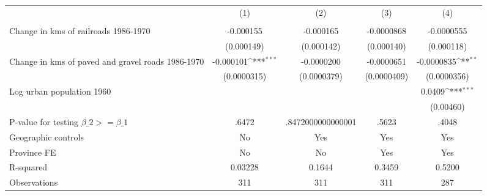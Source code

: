 {
\def\sym#1{\ifmmode^{#1}\else\(^{#1}\)\fi}
\begin{tabular}{l*{4}{c}}
\hline\hline
                &\multicolumn{1}{c}{(1)}&\multicolumn{1}{c}{(2)}&\multicolumn{1}{c}{(3)}&\multicolumn{1}{c}{(4)}\\
                &\multicolumn{1}{c}{}&\multicolumn{1}{c}{}&\multicolumn{1}{c}{}&\multicolumn{1}{c}{}\\
\hline
Change in kms of railroads 1986-1970&-0.000155         &-0.000165         &-0.0000868         &-0.0000555         \\
                &(0.000149)         &(0.000142)         &(0.000140)         &(0.000118)         \\
[1em]
Change in kms of paved and gravel roads 1986-1970&-0.000101\sym{***}&-0.0000200         &-0.0000651         &-0.0000835\sym{**} \\
                &(0.0000315)         &(0.0000379)         &(0.0000409)         &(0.0000356)         \\
[1em]
Log urban population 1960&                  &                  &                  &   0.0409\sym{***}\\
                &                  &                  &                  &(0.00460)         \\
\hline
P-value for testing $\beta\_{2} >= \beta\_{1}$&    .6472         &.8472000000000001         &    .5623         &    .4048         \\
Geographic controls&       No         &      Yes         &      Yes         &      Yes         \\
Province FE     &       No         &       No         &      Yes         &      Yes         \\
R-squared       &  0.03228         &   0.1644         &   0.3459         &   0.5200         \\
Observations    &      311         &      311         &      311         &      287         \\
\hline\hline
\end{tabular}
}
